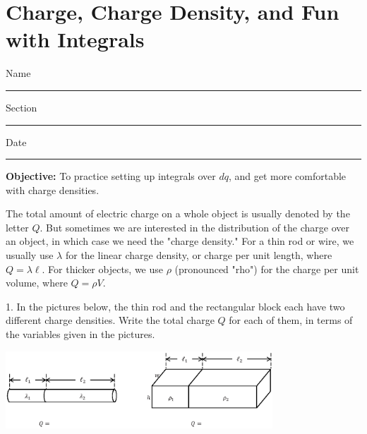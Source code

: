 \section{Charge, Charge Density, and Fun with Integrals}

Name \rule{2.0in}{0.1pt}\hfill{}Section \rule{1.0in}{0.1pt}\hfill{}Date
\rule{1.0in}{0.1pt}

\vspace{0.1in}
\textbf{Objective:} To practice setting up integrals over $dq$, and get more comfortable with charge densities.

\vspace{0.1in}
The total amount of electric charge on a whole object is usually denoted by the letter $Q$. But sometimes we are interested in the distribution of the charge over an object, in which case we need the "charge density."  For a thin rod or wire, we usually use $\lambda$ for the linear charge density, or charge per unit length, where $Q = \lambda \ell$. For thicker objects, we use $\rho$ (pronounced "rho") for the charge per unit volume, where $Q = \rho V$. 

1. In the pictures below, the thin rod and the rectangular block each have two different charge densities.  Write the total charge $Q$ for each of them, in terms of the variables given in the pictures.
\begin{center}
\includegraphics[width=0.75\textwidth]{charge_density/fig1.eps}
\end{center}

